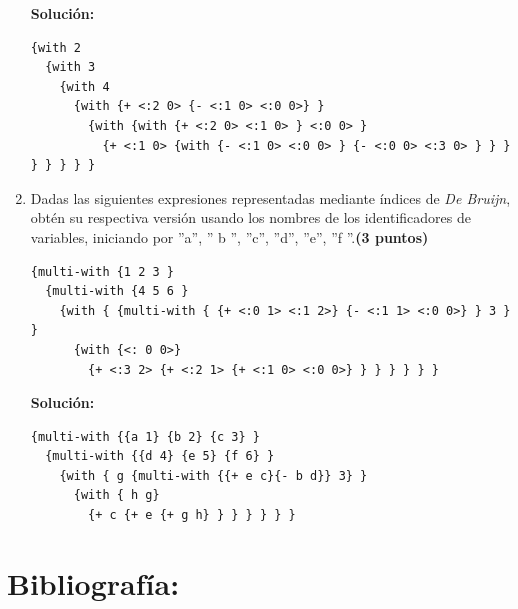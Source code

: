 \documentclass[11pt]{article}
\begin{document}
\begin{enumerate}[leftmargin=0.8cm]
    \textbf{Solución:}

    \begin{lstlisting}
{with 2
  {with 3
    {with 4
      {with {+ <:2 0> {- <:1 0> <:0 0>} }
        {with {with {+ <:2 0> <:1 0> } <:0 0> }
          {+ <:1 0> {with {- <:1 0> <:0 0> } {- <:0 0> <:3 0> } } } } } } } }
    \end{lstlisting}


    \item Dadas las siguientes expresiones representadas mediante índices de \textit{De Bruijn}, obtén su respectiva versión usando los nombres de los identificadores de variables, iniciando por ”a”, ” b ”, ”c”, ”d”, ”e”, ”f ”.\textbf{(3 puntos)}

    \begin{lstlisting}
{multi-with {1 2 3 }
  {multi-with {4 5 6 }
    {with { {multi-with { {+ <:0 1> <:1 2>} {- <:1 1> <:0 0>} } 3 } }
      {with {<: 0 0>}
        {+ <:3 2> {+ <:2 1> {+ <:1 0> <:0 0>} } } } } } }
    \end{lstlisting}

    \textbf{Solución:}

    \begin{lstlisting}
{multi-with {{a 1} {b 2} {c 3} }
  {multi-with {{d 4} {e 5} {f 6} }
    {with { g {multi-with {{+ e c}{- b d}} 3} }
      {with { h g}
        {+ c {+ e {+ g h} } } } } } }
    \end{lstlisting}

\end{enumerate}

\section*{Bibliografía:}
\end{document}
